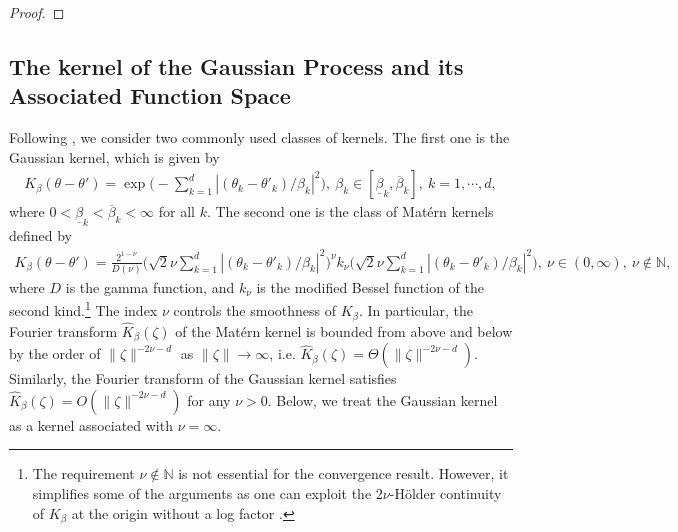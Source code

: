 \documentclass[letterpaper,11pt]{article}
\theoremstyle{myplain}
\theoremstyle{mydefinition}
\theoremstyle{myremark}
\renewcommand{\cite}{\citet}
\numberwithin{equation}{section}
\numberwithin{figure}{section}
\begin{document}
\begin{appendices}
\begin{proof}
\end{proof}

\subsection{The kernel of the Gaussian Process and its Associated Function Space}\label{sec:RKHS}
Following \cite{Bull_Convergence_2011}, we consider two commonly used classes of kernels. 
The first one is the Gaussian kernel, which is given by
\begin{align}
K_{\beta}(\theta-\theta')=\exp\big(-\sum_{k=1}^d|(\theta_k-\theta'_k)/\beta_k|^{2}\big), ~\beta_k\in[\underline{\beta}_k,\overline{\beta}_k], ~k=1,\cdots,d,	\label{eq:kernel}
\end{align}
where $0<\underline{\beta}_k<\overline{\beta}_k<\infty$ for all $k$.
The second one is the class of Mat\'{e}rn kernels \citep[see, e.g.,][Chapter 4]{ras:wil05} defined by
\begin{align*}
K_{\beta}(\theta-\theta')=\frac{2^{1-\nu}}{D(\nu)}\Big(\sqrt 2\nu\sum_{k=1}^d|(\theta_k-\theta'_k)/\beta_k|^{2}\Big)^\nu k_\nu\Big(\sqrt 2\nu\sum_{k=1}^d|(\theta_k-\theta'_k)/\beta_k|^{2}\Big),~\nu\in(0,\infty),~\nu\notin\mathbb N,
\end{align*}
where $D$ is the gamma function, and $k_\nu$ is the modified Bessel function of the second kind.\footnote{The requirement $\nu\notin\mathbb N$ is not essential for the convergence result. However, it simplifies some of the arguments as one can exploit the $2\nu$-H\"{o}lder continuity of $K_\beta$ at the origin without a log factor \citep[][Assumption 4]{Bull_Convergence_2011}.}
The index $\nu$ controls the smoothness of $K_\beta$. In particular, the Fourier transform $\hat K_\beta(\zeta)$ of the Mat\'{e}rn kernel is bounded from above and below by the order of $\|\zeta\|^{-2\nu-d}$ as $\|\zeta\|\to\infty$, i.e. $\hat K_\beta(\zeta)=\Theta(\|\zeta\|^{-2\nu-d})$. Similarly, the Fourier transform of the Gaussian kernel satisfies $\hat K_\beta(\zeta)=O(\|\zeta\|^{-2\nu-d})$ for any $\nu>0$. Below, we treat the Gaussian kernel as a kernel associated with $\nu=\infty.$



\end{appendices}
\end{document}
